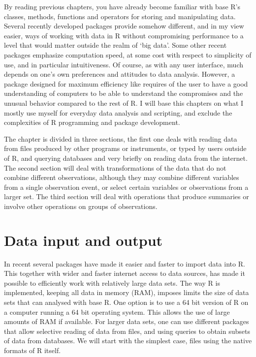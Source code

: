 \documentclass[krantz2,ChapterTOCs]{krantz}\usepackage{knitr}
\begin{document}
By reading previous chapters, you have already become familiar with base R's classes, methods, functions and operators for storing and manipulating data. Several recently developed packages provide somehow different, and in my view easier, ways of working with data in R without compromising performance to a level that would matter outside the realm of `big data'. Some other recent packages emphasize computation speed, at some cost with respect to simplicity of use, and in particular intuitiveness. Of course, as with any user interface, much depends on one's own preferences and attitudes to data analysis. However, a package designed for maximum efficiency like  requires of the user to have a good understanding of computers to be able to understand the compromises and the unusual behavior compared to the rest of R. I will base this chapters on what I mostly use myself for everyday data analysis and scripting, and exclude the complexities of R programming and package development.

The chapter is divided in three sections, the first one deals with reading data from files produced by other programs or instruments, or typed by users outside of R, and querying databases and very briefly on reading data from the internet. The second section will deal with transformations of the data that do not combine different observations, although they may combine different variables from a single observation event, or select certain variables or observations from a larger set. The third section will deal with operations that produce summaries or involve other operations on groups of observations.

\section{Data input and output}\label{sec:data:io}

In recent several packages have made it easier and faster to import data into R. This together with wider and faster internet access to data sources, has made it possible to efficiently work with relatively large data sets. The way R is implemented, keeping all data in memory (RAM), imposes limits the size of data sets that can analysed with base R. One option is to use a 64 bit version of R on a computer running a 64 bit operating system. This allows the use of large amounts of RAM if available. For larger data sets, one can use different packages that allow selective reading of data from files, and using queries to obtain subsets of data from databases. We will start with the simplest case, files using the native formats of R itself.
\end{document}
